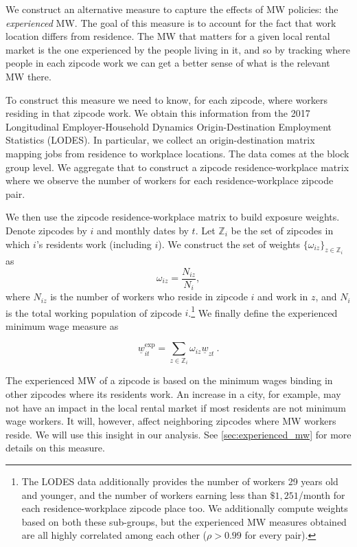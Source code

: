 We construct an alternative measure to capture the effects of MW policies: the 
\textit{experienced} MW. The goal of this measure is to account for the fact that work 
location differs from residence. The MW that matters for a given local rental market 
is the one experienced by the people living in it, and so by tracking where people in 
each zipcode work we can get a better sense of what is the relevant MW there.

To construct this measure we need to know, for each zipcode, where workers residing in that 
zipcode work. We obtain this information from the 2017 Longitudinal Employer-Household 
Dynamics Origin-Destination Employment Statistics (LODES). In particular, we collect an 
origin-destination matrix mapping jobs from residence to workplace locations. The data 
comes at the block group level. We aggregate that to construct a zipcode residence-workplace
matrix where we observe the number of workers for each residence-workplace zipcode pair.

We then use the zipcode residence-workplace matrix to build exposure weights. 
Denote zipcodes by $i$ and monthly dates by $t$. Let 
$\mathds{Z}_i$ be the set of zipcodes in which $i$'s residents work (including $i$). 
We construct the set of weights $\{\omega_{iz}\}_{z \in \mathds{Z}_i}$ as $$\omega_{iz} = 
\frac{N_{iz}}{N_i} , $$ where $N_{iz}$ is the number of workers who reside 
in zipcode $i$ and work in $z$, and $N_i$ is the total working population of zipcode $i$.\footnote{The 
	LODES data additionally provides the number of workers 29 years old and younger, and the 
	number of workers earning less than $\$1,251$/month for each residence-workplace zipcode place too.
	We additionally compute weights based on both these sub-groups, but the experienced MW 
measures obtained are all highly correlated among each other ($\rho>0.99$ for every pair).} We
finally define the experienced minimum wage measure as

\begin{equation}
	\underline{w}^{\text{exp}}_{it} = \sum_{z \in \mathds{Z}_i} \omega_{iz} \underline{w}_{zt} \ . 
\end{equation}

The experienced MW of a zipcode is based on the minimum wages binding in other zipcodes 
where its residents work. An increase in a city, for example, may not have an impact in 
the local rental market if most residents are not minimum wage workers. It will, however, 
affect neighboring zipcodes where MW workers reside. We will use this insight in our 
analysis. See \autoref{sec:experienced_mw} for more details on this measure.

